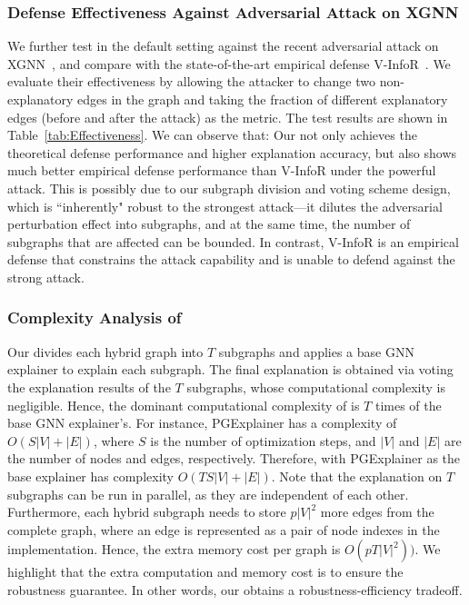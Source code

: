 {
\subsubsection{Defense Effectiveness Against Adversarial Attack on XGNN}
We further test {\name} in the default setting against the recent adversarial attack on XGNN~\citep{li2024graph}, and compare with the  state-of-the-art empirical defense V-InfoR~\citep{wang2023vinfor}. We evaluate their effectiveness by allowing the attacker to change two non-explanatory edges in the graph and taking the fraction of different explanatory edges (before and after the attack) as the metric. The test results are shown in Table~\ref{tab:Effectiveness}. We can observe that: Our {\name} not only achieves the theoretical defense performance and higher explanation accuracy, but also shows much better empirical defense performance than V-InfoR under the powerful attack. This is possibly due to our subgraph division and voting scheme design, which is ``inherently" robust to the strongest attack---it dilutes the adversarial perturbation effect into subgraphs, and at the same time, the number of subgraphs that are affected can be bounded. In contrast, V-InfoR is an empirical defense that constrains the attack capability and is unable to defend against the strong attack. 

\subsubsection{Complexity Analysis of {\name}}
Our {\name} divides each hybrid graph into $T$ subgraphs and applies a base GNN explainer to explain each subgraph. The final explanation is obtained via voting the explanation results of the $T$ subgraphs, whose computational complexity is negligible. Hence, the dominant computational complexity of {\name} is $T$ times of the base GNN explainer’s. For instance, PGExplainer has a complexity of $O(S|V|+|E|)$, where $S$ is the number of optimization steps, and $|V|$ and $|E|$ are the number of nodes and edges, respectively. Therefore, {\name} with PGExplainer as the base explainer has complexity $O(TS|V|+|E|)$. 
Note that the explanation on $T$ subgraphs can be run in parallel, as they are independent of each other. 
{Furthermore, each hybrid subgraph needs to store $p|V|^2$ more edges from the complete graph, where an edge is represented as a pair of node indexes in the implementation. Hence, the extra memory cost per graph is $O(pT|V|^2))$.}
We highlight that the extra computation and memory cost is to ensure the robustness guarantee. In other words, our {\name} obtains a robustness-efficiency tradeoff.
}